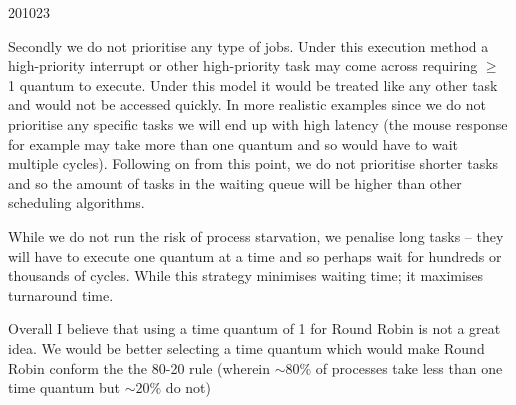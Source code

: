 \documentclass[10pt,\jkfside,a4paper]{article}
\begin{document}
\begin{examquestion}{2010}{2}{3}
\begin{enumerate}
\begin{enumerate}
Secondly we do not prioritise any type of jobs. Under this execution method a high-priority 
interrupt or other high-priority task may come across requiring $\geq$ 1 quantum to execute. 
Under this model it would be treated like any other task and would not be accessed quickly. 
In more realistic examples since we do not prioritise any specific tasks we will end up with 
high latency (the mouse response for example may take more than one quantum and so would 
have to wait multiple cycles). Following on from this point, we do not prioritise shorter 
tasks and so the amount of tasks in the waiting queue will be higher than other scheduling 
algorithms.

While we do not run the risk of process starvation, we penalise long tasks -- they will have 
to execute one quantum at a time and so perhaps wait for hundreds or thousands of cycles.
While this strategy minimises waiting time; it maximises turnaround time.

Overall I believe that using a time quantum of 1 for Round Robin is not a great idea. We 
would be better selecting a time quantum which would make Round Robin conform the the 80-20 rule 
(wherein $\sim80\%$ of processes take less than one time quantum but $\sim20\%$ do not)

\end{enumerate}

\end{enumerate}

\end{examquestion}
\end{document}
